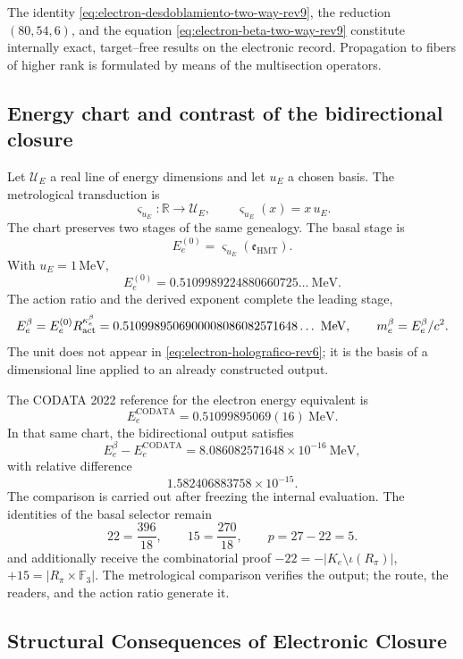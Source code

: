 \begin{statusbox}[title={Internal Closure of Bidirectional Refinement}]
The identity \eqref{eq:electron-desdoblamiento-two-way-rev9}, the reduction
\((80,54,6)\), and the equation
\eqref{eq:electron-beta-two-way-rev9} constitute internally exact,
target--free results on the electronic record. Propagation to fibers of
higher rank is formulated by means of the multisection operators.
\end{statusbox}

\subsection{Energy chart and contrast of the bidirectional closure}

Let \(\mathcal U_E\) a real line of energy dimensions and let
\(u_E\) a chosen basis. The metrological transduction is
\[
 \varsigma_{u_E}:\mathbb R\longrightarrow\mathcal U_E,
 \qquad
 \varsigma_{u_E}(x)=x\,u_E.
\]
The chart preserves two stages of the same genealogy. The basal stage is
\[
 E_e^{(0)}
 =
 \varsigma_{u_E}(\mathfrak e_{\mathrm{HMT}}).
\]
With \(u_E=1\,\mathrm{MeV}\),
\[
 E_e^{(0)}
 =
 0.5109989224880660725\ldots\ \mathrm{MeV}.
\]
The action ratio and the derived exponent complete the leading stage,
\[
 E_e^\beta=E_e^{(0)}R_{\rm act}^{\kappa_e^\beta}
 =0.5109989506900008086082571648\ldots\ \mathrm{MeV},
 \qquad
 m_e^\beta=E_e^\beta/c^2.
\]
The unit does not appear in \cref{eq:electron-holografico-rev6}; it is the basis of a dimensional
line applied to an already constructed output.

The CODATA 2022 reference for the electron energy equivalent is
\cite{CODATA2022}
\[
 E_e^{\mathrm{CODATA}}
 =
 0.51099895069(16)\ \mathrm{MeV}.
\]
In that same chart, the bidirectional output satisfies
\[
 E_e^\beta-E_e^{\mathrm{CODATA}}
 =
 8.086082571648\times10^{-16}\ \mathrm{MeV},
\]
with relative difference
\[
 1.582406883758\times10^{-15}.
\]
The comparison is carried out after freezing the internal evaluation. The identities of the basal selector remain
\[
 22=\frac{396}{18},
 \qquad
 15=\frac{270}{18},
 \qquad
 p=27-22=5.
\]
and additionally receive the combinatorial proof
\(-22=-|K_e\setminus\iota(R_\pi)|\),
\(+15=|R_\pi\times\mathbb F_3|\). The metrological comparison verifies the
output; the route, the readers, and the action ratio generate it.

\subsection{Structural Consequences of Electronic Closure}

